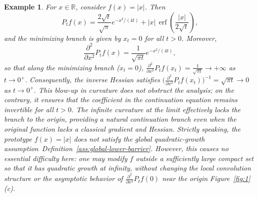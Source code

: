 \documentclass{article}
\newtheorem{example}[example]{Example}
\begin{document}
\begin{example}\label{ex:linear} For $x\in\mathbb R$, consider $f(x)=|x|$. Then 
$$ P_t f(x) = \frac{2\sqrt t}{\sqrt\pi}e^{-x^2/(4t)} + |x|\,\operatorname{erf}\!\left(\frac{|x|}{2\sqrt t}\right), $$
and the minimizing branch is given by 
$x_t=0$ for all $t>0$. Moreover,
$$
\frac{\partial^2}{\partial x^2}P_{t}f(x)
=
\frac{1}{\sqrt{\pi t}}e^{-x^2/(4t)},
$$
so that along the minimizing branch ($x_t=0$), $\frac{\partial^2}{\partial x^2}P_{t}f(x_t)=\frac{1}{\sqrt{\pi t}}
\to +\infty$ as $t\to0^+.$ Consequently, the inverse Hessian satisfies $\bigl(\frac{\partial^2}{\partial x^2}P_{t}f(x_t)\bigr)^{-1}=\sqrt{\pi t}\to 0$ as $t\to0^+.$ This blow-up in curvature does not obstruct the analysis; on the contrary, it ensures that the coefficient in the continuation equation remains invertible for all $t>0$. The infinite curvature at the limit effectively locks the branch to the origin, providing a natural continuation branch even when the original function lacks a classical gradient and Hessian. Strictly speaking, the prototype $f(x)=|x|$ does not satisfy the global quadratic-growth assumption~Definition~\ref{ass:global-lower-barrier}. However, this causes no essential difficulty here: one may modify $f$ outside a sufficiently large compact set so that it has quadratic growth at infinity, without changing the local convolution structure or the asymptotic behavior of $\frac{\partial^2}{\partial x^2}P_t f(0)$ near the origin Figure~\ref{fig:1}(c).
\end{example}
\end{document}
